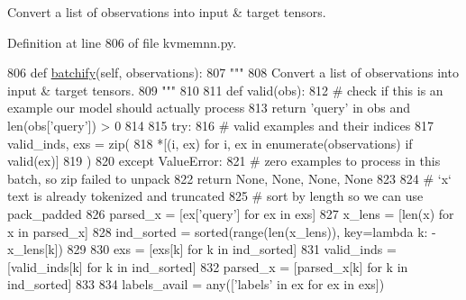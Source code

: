 \begin{DoxyVerb}Convert a list of observations into input & target tensors.
\end{DoxyVerb}
 

Definition at line 806 of file kvmemnn.\+py.


\begin{DoxyCode}
806     \textcolor{keyword}{def }\hyperlink{namespaceparlai_1_1agents_1_1drqa_1_1utils_aca22dd97c5b6dcda2a7479c1cb22ef1e}{batchify}(self, observations):
807         \textcolor{stringliteral}{"""}
808 \textcolor{stringliteral}{        Convert a list of observations into input & target tensors.}
809 \textcolor{stringliteral}{        """}
810 
811         \textcolor{keyword}{def }valid(obs):
812             \textcolor{comment}{# check if this is an example our model should actually process}
813             \textcolor{keywordflow}{return} \textcolor{stringliteral}{'query'} \textcolor{keywordflow}{in} obs \textcolor{keywordflow}{and} len(obs[\textcolor{stringliteral}{'query'}]) > 0
814 
815         \textcolor{keywordflow}{try}:
816             \textcolor{comment}{# valid examples and their indices}
817             valid\_inds, exs = zip(
818                 *[(i, ex) \textcolor{keywordflow}{for} i, ex \textcolor{keywordflow}{in} enumerate(observations) \textcolor{keywordflow}{if} valid(ex)]
819             )
820         \textcolor{keywordflow}{except} ValueError:
821             \textcolor{comment}{# zero examples to process in this batch, so zip failed to unpack}
822             \textcolor{keywordflow}{return} \textcolor{keywordtype}{None}, \textcolor{keywordtype}{None}, \textcolor{keywordtype}{None}, \textcolor{keywordtype}{None}
823 
824         \textcolor{comment}{# `x` text is already tokenized and truncated}
825         \textcolor{comment}{# sort by length so we can use pack\_padded}
826         parsed\_x = [ex[\textcolor{stringliteral}{'query'}] \textcolor{keywordflow}{for} ex \textcolor{keywordflow}{in} exs]
827         x\_lens = [len(x) \textcolor{keywordflow}{for} x \textcolor{keywordflow}{in} parsed\_x]
828         ind\_sorted = sorted(range(len(x\_lens)), key=\textcolor{keyword}{lambda} k: -x\_lens[k])
829 
830         exs = [exs[k] \textcolor{keywordflow}{for} k \textcolor{keywordflow}{in} ind\_sorted]
831         valid\_inds = [valid\_inds[k] \textcolor{keywordflow}{for} k \textcolor{keywordflow}{in} ind\_sorted]
832         parsed\_x = [parsed\_x[k] \textcolor{keywordflow}{for} k \textcolor{keywordflow}{in} ind\_sorted]
833 
834         labels\_avail = any([\textcolor{stringliteral}{'labels'} \textcolor{keywordflow}{in} ex \textcolor{keywordflow}{for} ex \textcolor{keywordflow}{in} exs])

\end{DoxyCode}
